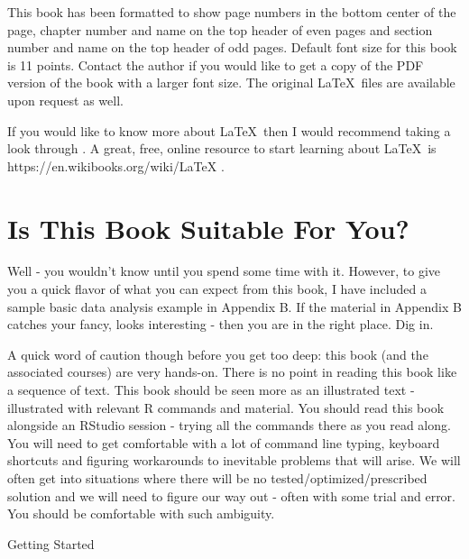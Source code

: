 \documentclass[11pt, letterpaper, twoside]{memoir}\usepackage{knitr}
\makeatletter
\newcommand{\chapterendsymbol}{
    \vspace{24pt}
    \Huge
    \hrulefill \hspace{0.1in} \floweroneleft\floweroneright \hspace{0.1in} \hrulefill
    \normalsize
    }
\renewcommand\part{%
  \if@openright
    \cleardoublepage
  \else
    \clearpage
  \fi
  \thispagestyle{empty}
  \null\vfil
  \secdef\@part\@spart
  }
\makeatother
\begin{document}
This book has been formatted to show page numbers in the bottom center of the page, chapter number and name on the top header of even pages and section number and name on the top header of odd pages. Default font size for this book is 11 points. Contact the author if you would like to get a copy of the PDF version of the book with a larger font size. The original \LaTeX\ files are available upon request as well.

If you would like to know more about \LaTeX\ then I would recommend taking a look through \citet{latexcompanion}. A great, free, online resource to start learning about \LaTeX\ is https://en.wikibooks.org/wiki/LaTeX \citep{LaTeXWik0:online}.

\section*{Is This Book Suitable For You?}

Well - you wouldn't know until you spend some time with it. However, to give you a quick flavor of what you can expect from this book, I have included a sample basic data analysis example in Appendix B. If the material in Appendix B catches your fancy, looks interesting - then you are in the right place. Dig in. 

A quick word of caution though before you get too deep: this book (and the associated courses) are very hands-on. There is no point in reading this book like a sequence of text. This book should be seen more as an illustrated text - illustrated with relevant R commands and material. You should read this book alongside an RStudio session - trying all the commands there as you read along. You will need to get comfortable with a lot of command line typing, keyboard shortcuts and figuring workarounds to inevitable problems that will arise. We will often get into situations where there will be no tested/optimized/prescribed solution and we will need to figure our way out - often with some trial and error. You should be comfortable with such ambiguity.

\chapterendsymbol


\mainmatter
\pagestyle{myruled}


\part{Getting Started}



\end{document}
